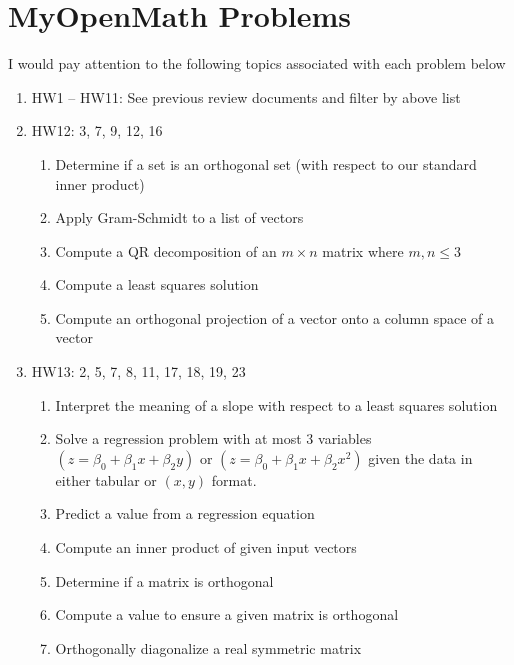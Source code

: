 \documentclass[12pt]{exam}
\begin{document}
\section{MyOpenMath Problems}
I would pay attention to the following topics associated with each problem below
\begin{enumerate}
    \item HW1 -- HW11: See previous review documents and filter by above list
    \item HW12: 3, 7, 9, 12, 16
        \begin{enumerate}
            \item Determine if a set is an orthogonal set (with respect to our standard inner product)
            \item Apply Gram-Schmidt to a list of vectors
            \item Compute a QR decomposition of an $m \times n$ matrix where $m, n \leq 3$
            \item Compute a least squares solution
            \item Compute an orthogonal projection of a vector onto a column space of a vector
        \end{enumerate}
    \item HW13: 2, 5, 7, 8, 11, 17, 18, 19, 23
        \begin{enumerate}
            \item Interpret the meaning of a slope with respect to a least squares solution
            \item Solve a regression problem with at most 3 variables $(z = \beta_0 + \beta_1 x + \beta_2 y)$
                or $(z = \beta_0 + \beta_1 x + \beta_2 x^2)$ given the data in either tabular or $(x,y)$ format.
            \item Predict a value from a regression equation
            \item Compute an inner product of given input vectors
            \item Determine if a matrix is orthogonal
            \item Compute a value to ensure a given matrix is orthogonal
            \item Orthogonally diagonalize a real symmetric matrix
        \end{enumerate}
\end{enumerate}
\end{document}
